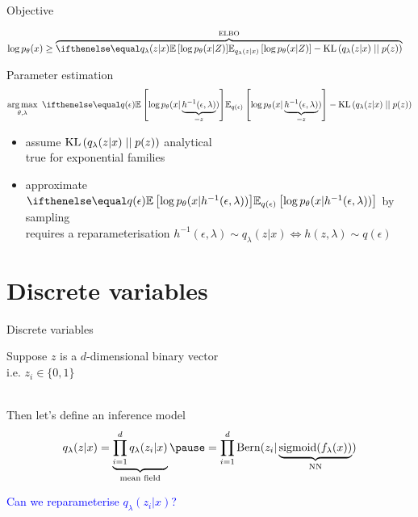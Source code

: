 \begin{frame}[plain]{Objective}

\begin{equation*}
\begin{aligned}
\log p_\theta(x) &\geq \overbrace{\E[q_\lambda(z|x)]{\log p_\theta(x|Z)} - \KL{q_\lambda(z|x)}{p(z)}}^{\ELBO} 
\end{aligned}
\end{equation*}

\pause

Parameter estimation
\begin{equation*}
\argmax_{\theta,\lambda} ~ \E[q(\epsilon)]{\log p_\theta(x|\underbrace{h^{-1}(\epsilon, \lambda)}_{=z})} - \KL{q_\lambda(z|x)}{p(z)}
\end{equation*}

\pause

\begin{itemize}
	\item assume $\operatorname{KL}\left(q_\lambda(z|x)\mid\mid p(z)\right)$  analytical\\
	true for exponential families \pause
	\item approximate $\E[q(\epsilon)]{\log p_\theta(x|h^{-1}(\epsilon, \lambda))}$ by sampling\\
	requires a reparameterisation $h^{-1}(\epsilon, \lambda) \sim q_\lambda(z|x)  \Leftrightarrow  h(z, \lambda) \sim q(\epsilon)$
\end{itemize}


\end{frame}

\section{Discrete variables}

\begin{frame}{Discrete variables}

Suppose $z$ is a $d$-dimensional binary vector \\
\quad i.e. $z_i \in \{0, 1\}$ \\

~ \pause

Then let's define an inference model
\begin{equation}
q_\lambda(z|x) = \underbrace{\prod_{i=1}^d q_\lambda(z_i|x)}_{\text{mean field}} \pause =  \prod_{i=1}^d \Bern(z_i|\underbrace{\sigmoid(f_\lambda(x))}_{\text{NN}})
\end{equation}


\pause

\textcolor{blue}{Can we reparameterise $q_\lambda(z_i|x)$? }


\end{frame}

